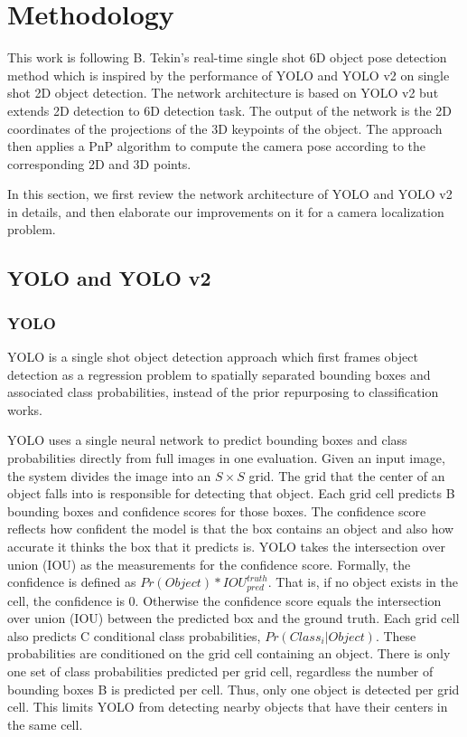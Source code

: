 \chapter{Methodology}

This work is following B. Tekin's real-time single shot 6D object pose detection method \cite{tekin2018real} which is inspired by the performance of YOLO and YOLO v2 on single shot 2D object detection. The network architecture is based on YOLO v2  but extends 2D detection to 6D detection task. The output of the network is the 2D coordinates of the projections of the 3D keypoints of the object. The approach then applies a PnP algorithm to compute the camera pose according to the corresponding 2D and 3D points.

In this section, we first review the network architecture of YOLO and YOLO v2 in details, and then elaborate our improvements on it for a camera localization problem.

\section{YOLO and YOLO v2}

\subsection{YOLO}
YOLO \cite{redmon2016you} is a single shot object detection approach which first frames object detection as a regression problem to spatially separated bounding boxes and associated class probabilities, instead of the prior repurposing to classification works.

YOLO uses a single neural network to predict bounding boxes and class probabilities directly from full images in one evaluation. Given an input image, the system divides the image into an $S \times S$ grid. The grid that the center of an object falls into is responsible for detecting that object. Each grid cell predicts B bounding boxes and confidence scores for those boxes. The confidence score reflects how confident the model is that the box contains an object and also how accurate it thinks the box that it predicts is. YOLO takes the intersection over union (IOU) as the measurements for the confidence score. Formally, the confidence is defined as $Pr(Object) * IOU_{pred}^{truth}$. That is, if no object exists in the cell, the confidence is 0. Otherwise the confidence score equals the intersection over union (IOU) between the predicted box and the ground truth. Each grid cell also predicts C conditional class probabilities, $Pr(Class_{i}|Object)$. These probabilities are conditioned on the grid cell containing an object. There is only one set of class probabilities predicted per grid cell, regardless the number of bounding boxes B is predicted per cell. Thus, only one object is detected per grid cell. This limits YOLO from detecting nearby objects that have their centers in the same cell.

